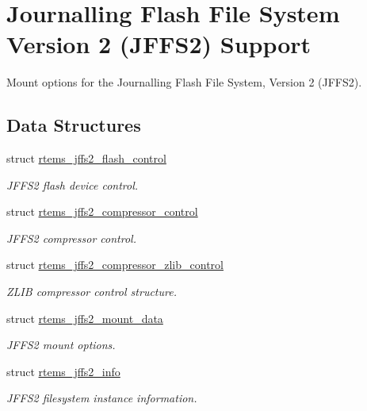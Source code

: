 \hypertarget{group__JFFS2}{}\section{Journalling Flash File System Version 2 (J\+F\+F\+S2) Support}
\label{group__JFFS2}


Mount options for the Journalling Flash File System, Version 2 (J\+F\+F\+S2).  


\subsection*{Data Structures}
\begin{DoxyCompactItemize}
\item 
struct \mbox{\hyperlink{structrtems__jffs2__flash__control}{rtems\+\_\+jffs2\+\_\+flash\+\_\+control}}
\begin{DoxyCompactList}\small\item\em J\+F\+F\+S2 flash device control. \end{DoxyCompactList}\item 
struct \mbox{\hyperlink{structrtems__jffs2__compressor__control}{rtems\+\_\+jffs2\+\_\+compressor\+\_\+control}}
\begin{DoxyCompactList}\small\item\em J\+F\+F\+S2 compressor control. \end{DoxyCompactList}\item 
struct \mbox{\hyperlink{structrtems__jffs2__compressor__zlib__control}{rtems\+\_\+jffs2\+\_\+compressor\+\_\+zlib\+\_\+control}}
\begin{DoxyCompactList}\small\item\em Z\+L\+IB compressor control structure. \end{DoxyCompactList}\item 
struct \mbox{\hyperlink{structrtems__jffs2__mount__data}{rtems\+\_\+jffs2\+\_\+mount\+\_\+data}}
\begin{DoxyCompactList}\small\item\em J\+F\+F\+S2 mount options. \end{DoxyCompactList}\item 
struct \mbox{\hyperlink{structrtems__jffs2__info}{rtems\+\_\+jffs2\+\_\+info}}
\begin{DoxyCompactList}\small\item\em J\+F\+F\+S2 filesystem instance information. \end{DoxyCompactList}\end{DoxyCompactItemize}
